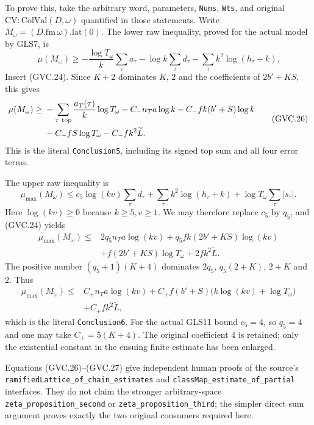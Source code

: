 To prove this, take the arbitrary word, parameters, \texttt{Nums},
\texttt{Wts}, and original $\mathrm{CV}:\mathrm{ColVal}(D,\omega)$
quantified in those statements. Write
$M_\omega=(D.\mathrm{fm}\,\omega).\mathrm{lat}(0)$.
The lower raw inequality, proved for the actual model by GLS7, is
\[
 \mu(M_\omega)\ge
 -\frac{\log T_\omega}{k}\sum_\tau a_\tau
 -\log k\sum_\tau d_\tau
 -\sum_\tau k^2\log(h_\tau+k).
\]
Insert (GVC.24). Since $K+2$ dominates $K$, $2$ and the
coefficients of $2b'+KS$, this gives
\[
 \begin{split}
 \mu(M_\omega)\ge{}&
 -\sum_{\tau\ {\rm top}}\frac{a_T(\tau)}{k}\log T_\omega
 -C_-n_Ta\log k-C_-fk(b'+S)\log k\\
 &-C_-fS\log T_\omega-C_-fk^2\widetilde L .
 \end{split}                                                 \tag{GVC.26}
\]
This is the literal \texttt{Conclusion5}, including its signed
top sum and all four error terms.

The upper raw inequality is
\[
 \mu_{\max}(M_\omega)\le
 c_5\log(kv)\sum_\tau d_\tau
 +\sum_\tau k^2\log(h_\tau+k)
 +\log T_\omega\sum_\tau|s_\tau|.
\]
Here $\log(kv)\ge0$ because $k\ge5,v\ge1$.
We may therefore replace $c_5$ by $q_5$, and (GVC.24) yields
\[
 \begin{split}
 \mu_{\max}(M_\omega)\le{}&
 2q_5n_Ta\log(kv)
 +q_5fk(2b'+KS)\log(kv)\\
 &+f(2b'+KS)\log T_\omega
 +2fk^2\widetilde L .
 \end{split}
\]
The positive number $(q_5+1)(K+4)$ dominates
$2q_5$, $q_5(2+K)$, $2+K$ and $2$.
Thus
\[
 \begin{split}
 \mu_{\max}(M_\omega)\le{}&
 C_+n_Ta\log(kv)
 +C_+f(b'+S)\bigl(k\log(kv)+\log T_\omega\bigr)\\
 &+C_+fk^2\widetilde L ,
 \end{split}                                                 \tag{GVC.27}
\]
which is the literal \texttt{Conclusion6}.
For the actual GLS11 bound $c_5=4$, so $q_5=4$ and one may
take $C_+=5(K+4)$. The original coefficient $4$ is retained;
only the existential constant in the ensuing finite estimate
has been enlarged.

Equations (GVC.26)--(GVC.27) give independent human proofs of
the source's \texttt{ramifiedLattice\_\allowbreak of\_\allowbreak chain\_\allowbreak estimates}
and \texttt{classMap\_\allowbreak estimate\_\allowbreak of\_\allowbreak partial} interfaces.
They do not claim the stronger arbitrary-space
\texttt{zeta\_proposition\_second} or
\texttt{zeta\_proposition\_third}; the simpler direct sum
argument proves exactly the two original consumers required here.

